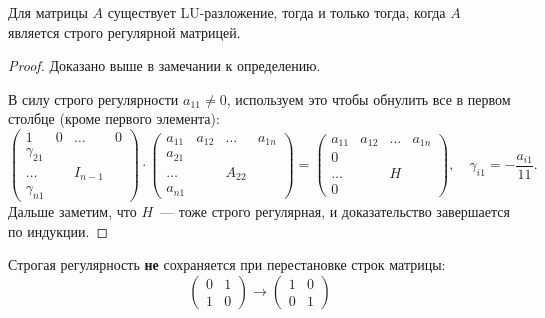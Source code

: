 \begin{theorem}
	Для матрицы $A$ существует LU-разложение, тогда и только тогда, когда $A$ является строго регулярной матрицей.

	\begin{proof}
		\circled{$\Rightarrow$} Доказано выше в замечании к определению.

		\circled{$\Leftarrow$} В силу строго регулярности $a_{11}\neq 0$, используем это чтобы обнулить все в первом
		столбце (кроме первого элемента):
		\[
			\left(
			\begin{array}{cccc}
					1           & 0 & \ldots  & 0 \\
					\gamma_{21} &                 \\
					\ldots      &   & I_{n-1}     \\
					\gamma_{n1} &
				\end{array}
			\right)\cdot
			\left(
			\begin{array}{cccc}
					a_{11} & a_{12} & \ldots & a_{1n} \\
					a_{21} &                          \\
					\ldots &        & A_{22}          \\
					a_{n1}
				\end{array}
			\right) =
			\left(
			\begin{array}{cccc}
					a_{11} & a_{12} & \ldots & a_{1n} \\
					0      &                          \\
					\ldots &        & H               \\
					0
				\end{array}
			\right),
			\quad \gamma_{i1}=-\dfrac{a_{i1}}{11}.
		\]
		Дальше заметим, что $H$~--- тоже строго регулярная, и доказательство завершается по индукции.

	\end{proof}
\end{theorem}

\begin{exercise}
	Строгая регулярность \textbf{не} сохраняется при перестановке строк матрицы:
	\[
		\left(
		\begin{array}{cc}
				0 & 1 \\
				1 & 0
			\end{array}
		\right)\rightarrow
		\left(
		\begin{array}{cc}
				1 & 0 \\
				0 & 1
			\end{array}
		\right)
	\]
\end{exercise}

